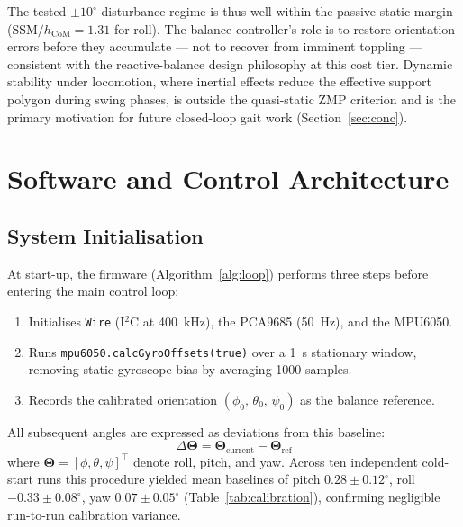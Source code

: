 \documentclass[journal]{IEEEtran}
\newcommand{\vect}[1]{\boldsymbol{#1}}
\newcommand{\dg}{^{\circ}}
\begin{document}
The tested $\pm10\dg$ disturbance regime is thus well within the
passive static margin (SSM$/ h_\text{CoM} = 1.31$ for roll).
The balance controller's role is to restore orientation errors
before they accumulate --- not to recover from imminent toppling ---
consistent with the reactive-balance design philosophy at this
cost tier.
Dynamic stability under locomotion, where inertial effects
reduce the effective support polygon during swing phases, is
outside the quasi-static ZMP criterion and is the primary
motivation for future closed-loop gait work
(Section~\ref{sec:conc}).
\section{Software and Control Architecture}
\label{sec:sw}
\subsection{System Initialisation}
At start-up, the firmware (Algorithm~\ref{alg:loop}) performs
three steps before entering the main control loop:
\begin{enumerate}
\item Initialises \texttt{Wire} (I$^2$C at \SI{400}{\kilo\hertz}),
      the PCA9685 (\SI{50}{\hertz}), and the MPU6050.
\item Runs \texttt{mpu6050.calcGyroOffsets(true)} over a
      \SI{1}{\second} stationary window, removing static
      gyroscope bias by averaging 1000 samples.
\item Records the calibrated orientation
      $(\phi_0,\,\theta_0,\,\psi_0)$ as the balance reference.
\end{enumerate}
All subsequent angles are expressed as deviations from this baseline:
\begin{equation}
\Delta\vect{\Theta} = \vect{\Theta}_\text{current} -
                      \vect{\Theta}_\text{ref}
\label{eq:offset}
\end{equation}
where $\vect{\Theta} = [\phi,\theta,\psi]^\top$ denote roll,
pitch, and yaw.
Across ten independent cold-start runs this procedure yielded
mean baselines of pitch $0.28 \pm 0.12\dg$,
roll $-0.33 \pm 0.08\dg$, yaw $0.07 \pm 0.05\dg$
(Table~\ref{tab:calibration}), confirming negligible
run-to-run calibration variance.
\end{document}
